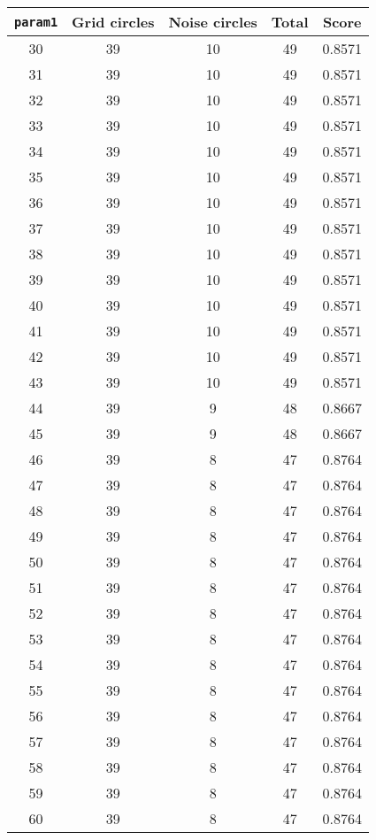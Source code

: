 \documentclass[letterpaper, 12pt]{article}
\begin{document}
\begin{longtable}{|c|c|c|c|c|}
\hline
\textbf{\texttt{param1}} & \textbf{Grid circles} & \textbf{Noise circles} & \textbf{Total} & \textbf{Score} \\
\hline
30 & 39 & 10 & 49 & 0.8571 \\
\hline
31 & 39 & 10 & 49 & 0.8571 \\
\hline
32 & 39 & 10 & 49 & 0.8571 \\
\hline
33 & 39 & 10 & 49 & 0.8571 \\
\hline
34 & 39 & 10 & 49 & 0.8571 \\
\hline
35 & 39 & 10 & 49 & 0.8571 \\
\hline
36 & 39 & 10 & 49 & 0.8571 \\
\hline
37 & 39 & 10 & 49 & 0.8571 \\
\hline
38 & 39 & 10 & 49 & 0.8571 \\
\hline
39 & 39 & 10 & 49 & 0.8571 \\
\hline
40 & 39 & 10 & 49 & 0.8571 \\
\hline
41 & 39 & 10 & 49 & 0.8571 \\
\hline
42 & 39 & 10 & 49 & 0.8571 \\
\hline
43 & 39 & 10 & 49 & 0.8571 \\
\hline
44 & 39 & 9 & 48 & 0.8667 \\
\hline
45 & 39 & 9 & 48 & 0.8667 \\
\hline
46 & 39 & 8 & 47 & 0.8764 \\
\hline
47 & 39 & 8 & 47 & 0.8764 \\
\hline
48 & 39 & 8 & 47 & 0.8764 \\
\hline
49 & 39 & 8 & 47 & 0.8764 \\
\hline
50 & 39 & 8 & 47 & 0.8764 \\
\hline
51 & 39 & 8 & 47 & 0.8764 \\
\hline
52 & 39 & 8 & 47 & 0.8764 \\
\hline
53 & 39 & 8 & 47 & 0.8764 \\
\hline
54 & 39 & 8 & 47 & 0.8764 \\
\hline
55 & 39 & 8 & 47 & 0.8764 \\
\hline
56 & 39 & 8 & 47 & 0.8764 \\
\hline
57 & 39 & 8 & 47 & 0.8764 \\
\hline
58 & 39 & 8 & 47 & 0.8764 \\
\hline
59 & 39 & 8 & 47 & 0.8764 \\
\hline
60 & 39 & 8 & 47 & 0.8764 \\
\hline

\end{longtable}
\end{document}
